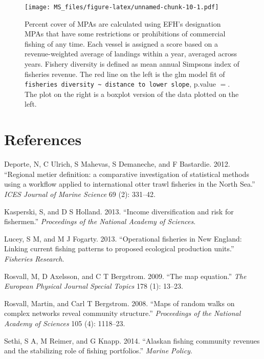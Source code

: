 \documentclass[]{article}
\begin{document}
\begin{figure}[htbp]
\centering
\texttt{[image: MS\_files/figure-latex/unnamed-chunk-10-1.pdf]}
\caption{Percent cover of MPAs are calculated using EFH's designation
MPAs that have some restrictions or prohibitions of commercial fishing
of any time. Each vessel is assigned a score based on a revenue-weighted
average of landings within a year, averaged across years. Fishery
diversity is defined as mean annual Simpsons index of fisheries revenue.
The red line on the left is the glm model fit of
\texttt{fisheries diversity \textasciitilde{} distance to lower slope},
p.value \(=\). The plot on the right is a boxplot version of the data
plotted on the left.}
\end{figure}

\section*{References}\label{references}

Deporte, N, C Ulrich, S Mahevas, S Demaneche, and F Bastardie. 2012.
``Regional metier definition: a comparative investigation of statistical
methods using a workflow applied to international otter trawl fisheries
in the North Sea.'' \emph{ICES Journal of Marine Science} 69 (2):
331--42.

Kasperski, S, and D S Holland. 2013. ``Income diversification and risk
for fishermen.'' \emph{Proceedings of the National Academy of Sciences}.

Lucey, S M, and M J Fogarty. 2013. ``Operational fisheries in New
England: Linking current fishing patterns to proposed ecological
production units.'' \emph{Fisheries Research}.

Rosvall, M, D Axelsson, and C T Bergstrom. 2009. ``The map equation.''
\emph{The European Physical Journal Special Topics} 178 (1): 13--23.

Rosvall, Martin, and Carl T Bergstrom. 2008. ``Maps of random walks on
complex networks reveal community structure.'' \emph{Proceedings of the
National Academy of Sciences} 105 (4): 1118--23.

Sethi, S A, M Reimer, and G Knapp. 2014. ``Alaskan fishing community
revenues and the stabilizing role of fishing portfolios.'' \emph{Marine
Policy}.
\end{document}
